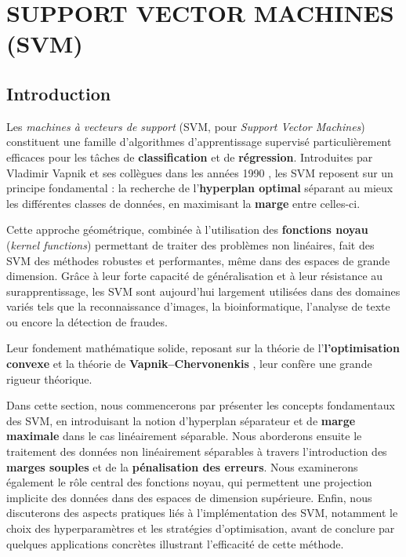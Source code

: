 \chapter{SUPPORT VECTOR MACHINES (SVM)}

\section{Introduction}

Les \textit{machines à vecteurs de support} (SVM, pour \textit{Support Vector Machines}) constituent une famille d’algorithmes d’apprentissage supervisé particulièrement efficaces pour les tâches de \textbf{classification} et de \textbf{régression}. Introduites par Vladimir Vapnik et ses collègues dans les années 1990 \citep{boser1992training}, les SVM reposent sur un principe fondamental : la recherche de l’\textbf{hyperplan optimal} séparant au mieux les différentes classes de données, en maximisant la \textbf{marge} entre celles-ci.

Cette approche géométrique, combinée à l’utilisation des \textbf{fonctions noyau} (\textit{kernel functions}) permettant de traiter des problèmes non linéaires, fait des SVM des méthodes robustes et performantes, même dans des espaces de grande dimension. Grâce à leur forte capacité de généralisation et à leur résistance au surapprentissage, les SVM sont aujourd’hui largement utilisées dans des domaines variés tels que la reconnaissance d’images, la bioinformatique, l’analyse de texte ou encore la détection de fraudes.

Leur fondement mathématique solide, reposant sur la théorie de l’\textbf{l’optimisation convexe} \citep{bertsekas2009convex} et la théorie de \textbf{Vapnik--Chervonenkis} \citep{devroye1996vapnik}, leur confère une grande rigueur théorique.

Dans cette section, nous commencerons par présenter les concepts fondamentaux des SVM, en introduisant la notion d’hyperplan séparateur et de \textbf{marge maximale} dans le cas linéairement séparable. Nous aborderons ensuite le traitement des données non linéairement séparables à travers l’introduction des \textbf{marges souples} et de la \textbf{pénalisation des erreurs}. Nous examinerons également le rôle central des fonctions noyau, qui permettent une projection implicite des données dans des espaces de dimension supérieure. Enfin, nous discuterons des aspects pratiques liés à l’implémentation des SVM,
notamment le choix des hyperparamètres et les stratégies d’optimisation, avant de conclure par quelques applications concrètes illustrant l’efficacité de cette méthode.


